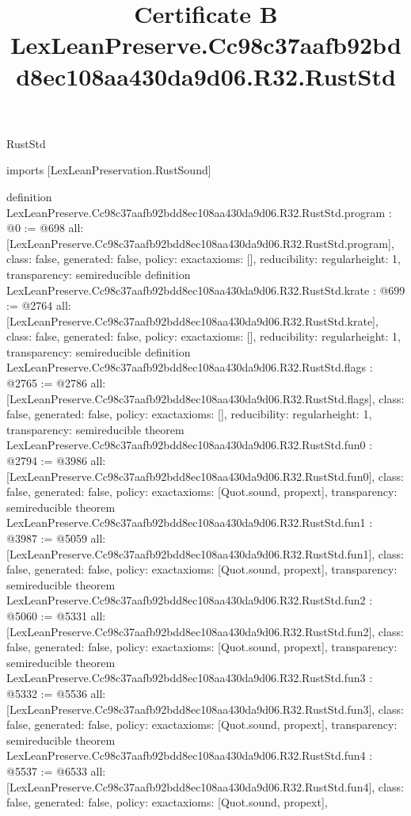 \begin{lexlean}{RustStd}
\title{Certificate B LexLeanPreserve.Cc98c37aafb92bdd8ec108aa430da9d06.R32.RustStd}
\begin{coremodule}
imports [LexLeanPreservation.RustSound]

definition LexLeanPreserve.Cc98c37aafb92bdd8ec108aa430da9d06.R32.RustStd.program : @0 := @698 {
  all: [LexLeanPreserve.Cc98c37aafb92bdd8ec108aa430da9d06.R32.RustStd.program],
  class: false,
  generated: false,
  policy: exact{axioms: []},
  reducibility: regular{height: 1},
  transparency: semireducible
}
definition LexLeanPreserve.Cc98c37aafb92bdd8ec108aa430da9d06.R32.RustStd.krate : @699 := @2764 {
  all: [LexLeanPreserve.Cc98c37aafb92bdd8ec108aa430da9d06.R32.RustStd.krate],
  class: false,
  generated: false,
  policy: exact{axioms: []},
  reducibility: regular{height: 1},
  transparency: semireducible
}
definition LexLeanPreserve.Cc98c37aafb92bdd8ec108aa430da9d06.R32.RustStd.flags : @2765 := @2786 {
  all: [LexLeanPreserve.Cc98c37aafb92bdd8ec108aa430da9d06.R32.RustStd.flags],
  class: false,
  generated: false,
  policy: exact{axioms: []},
  reducibility: regular{height: 1},
  transparency: semireducible
}
theorem LexLeanPreserve.Cc98c37aafb92bdd8ec108aa430da9d06.R32.RustStd.fun0 : @2794 := @3986 {
  all: [LexLeanPreserve.Cc98c37aafb92bdd8ec108aa430da9d06.R32.RustStd.fun0],
  class: false,
  generated: false,
  policy: exact{axioms: [Quot.sound, propext]},
  transparency: semireducible
}
theorem LexLeanPreserve.Cc98c37aafb92bdd8ec108aa430da9d06.R32.RustStd.fun1 : @3987 := @5059 {
  all: [LexLeanPreserve.Cc98c37aafb92bdd8ec108aa430da9d06.R32.RustStd.fun1],
  class: false,
  generated: false,
  policy: exact{axioms: [Quot.sound, propext]},
  transparency: semireducible
}
theorem LexLeanPreserve.Cc98c37aafb92bdd8ec108aa430da9d06.R32.RustStd.fun2 : @5060 := @5331 {
  all: [LexLeanPreserve.Cc98c37aafb92bdd8ec108aa430da9d06.R32.RustStd.fun2],
  class: false,
  generated: false,
  policy: exact{axioms: [Quot.sound, propext]},
  transparency: semireducible
}
theorem LexLeanPreserve.Cc98c37aafb92bdd8ec108aa430da9d06.R32.RustStd.fun3 : @5332 := @5536 {
  all: [LexLeanPreserve.Cc98c37aafb92bdd8ec108aa430da9d06.R32.RustStd.fun3],
  class: false,
  generated: false,
  policy: exact{axioms: [Quot.sound, propext]},
  transparency: semireducible
}
theorem LexLeanPreserve.Cc98c37aafb92bdd8ec108aa430da9d06.R32.RustStd.fun4 : @5537 := @6533 {
  all: [LexLeanPreserve.Cc98c37aafb92bdd8ec108aa430da9d06.R32.RustStd.fun4],
  class: false,
  generated: false,
  policy: exact{axioms: [Quot.sound, propext]},
}
\end{coremodule}
\end{lexlean}
